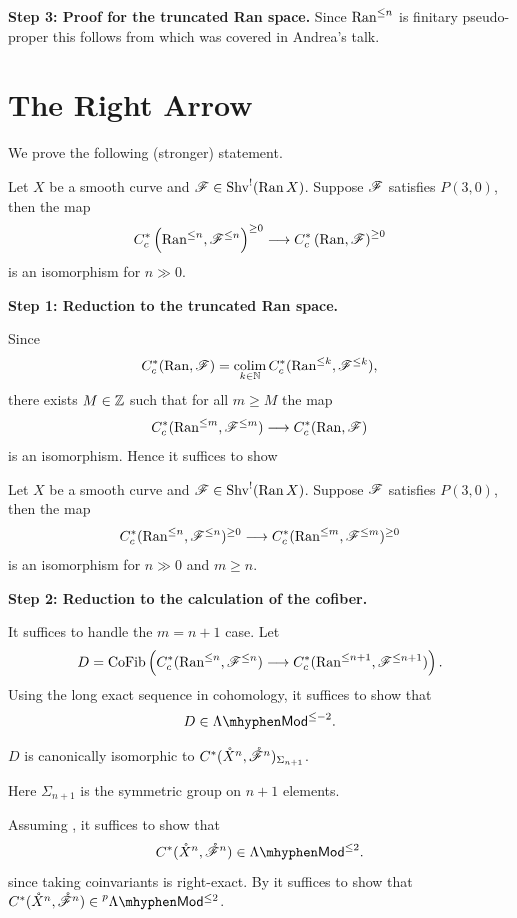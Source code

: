 \documentclass[oneside]{amsart}
\newcommand{\plMod}{\prescript{p}{}{\lMod}}
\begin{document}
\textbf{Step 3: Proof for the truncated Ran space.}
Since $\operatorname{Ran}^{\le n}$ is finitary pseudo-proper this follows from \cite[Corollary~7.5.6]{abott} which was covered in Andrea's talk.

\section{The Right Arrow}
We prove the following (stronger) statement.

\begin{proposition}\label{prop:ti}
	Let $X$ be a smooth curve and $\mathscr{F}\in \operatorname{Shv}^{!}(\operatorname{Ran} X)$. Suppose $\mathscr{F}$ satisfies $P(3,0)$, then the map
	\[
	C^{*}_c\left( \Ran^{\le n},\CF^{\le n} \right) ^{\ge 0} \to C^{*}_c\left( \Ran, \CF \right) ^{\ge 0}
	\] 
	is an isomorphism for $n\gg 0$.
\end{proposition}
\textbf{Step 1: Reduction to the truncated Ran space.}

Since
\begin{equation}\label{eq:colim}
C^{*}_c(\operatorname{Ran},\mathscr{F}) = \operatorname*{colim}_{k\in \mathbb N} C^{*}_c(\operatorname{Ran}^{\le k},\mathscr{F}^{\le k}),
\end{equation} 
there exists $M\in \mathbb Z$ such that for all $m\ge M$ the map
\[
C_c^{*}(\Ran^{\le m},\CF^{\le m}) \to C^{*}_c(\Ran,\CF)
\] 
is an isomorphism. Hence it suffices to show
\begin{lemma}\label{prop:tit}
	Let $X$ be a smooth curve and $\mathscr{F}\in \operatorname{Shv}^{!}(\operatorname{Ran} X)$. Suppose $\mathscr{F}$ satisfies $P(3,0)$, then the map
	\[
	C^{*}_c(\Ran^{\le n},\CF^{\le n})^{\ge 0} \to C^{*}_c(\Ran^{\le m},\CF^{\le m})^{\ge 0}
	\] 
	is an isomorphism for $n\gg 0$ and $m\ge n$.
\end{lemma}

\textbf{Step 2: Reduction to the calculation of the cofiber.}

It suffices to handle the $m=n+1$ case. Let
\[
D = \CoFib\left(  C^{*}_c(\Ran^{\le n},\CF^{\le n}) \to C^{*}_c(\Ran^{\le n+1},\CF^{\le n+1})
\right). 
\] 
Using the long exact sequence in cohomology, it suffices to show that
\[
D\in \lMod^{\le -2}.
\] 

\begin{lemma}\label{lmm:cofibcoh}
	$D$ is canonically isomorphic to $C^{*}(\mathring{X}^{n}, \mathring{\mathscr{F}}^{n})_{\Sigma_{n+1}}$.
\end{lemma}
Here $\Sigma_{n+1}$ is the symmetric group on $n+1$ elements.

Assuming , it suffices to show that
\[
	C^{*}(\mathring{X}^{n},\mathring{\CF}^{n}) \in \lMod^{\le 2}.
\] 
since taking coinvariants is right-exact. By  it suffices to show that $C^{*}(\mathring{X}^{n},\mathring{\CF}^{n})\in \plMod^{\le 2}$.
\end{document}
